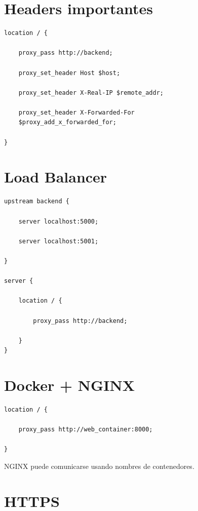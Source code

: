 \documentclass[a4paper,11pt]{article}
\begin{document}
\section*{Headers importantes}

\begin{lstlisting}
location / {

    proxy_pass http://backend;

    proxy_set_header Host $host;

    proxy_set_header X-Real-IP $remote_addr;

    proxy_set_header X-Forwarded-For
    $proxy_add_x_forwarded_for;

}
\end{lstlisting}


\section*{Load Balancer}

\begin{lstlisting}
upstream backend {

    server localhost:5000;

    server localhost:5001;

}

server {

    location / {

        proxy_pass http://backend;

    }
}
\end{lstlisting}


\section*{Docker + NGINX}

\begin{lstlisting}
location / {

    proxy_pass http://web_container:8000;

}
\end{lstlisting}

NGINX puede comunicarse usando nombres
de contenedores.


\section*{HTTPS}
\end{document}
